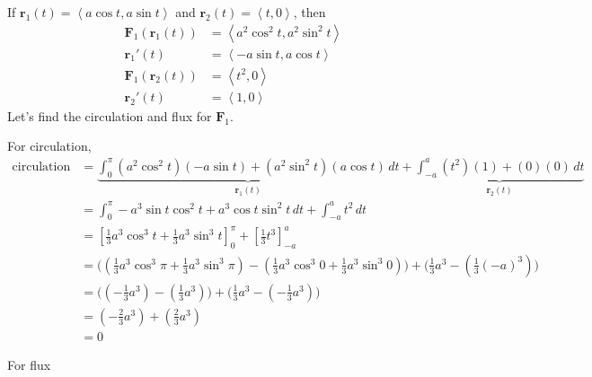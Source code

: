 \documentclass{article}
\newcommand{\lrp}[1]{\left( #1 \right)}
\newcommand{\lra}[1]{\left\langle #1 \right\rangle}
\newcommand{\lrb}[1]{\left[ #1 \right]}
\renewcommand{\r}[0]{\mathbf{r}}
\newcommand{\F}[0]{\mathbf{F}}
\begin{document}
If $\r_1(t)=\lra{a\cos t, a\sin t}$ and $\r_2 (t)=\lra{t,0}$, then
\begin{align*}
    \F_1\lrp{\r_1(t)}&=\lra{a^2\cos^2 t, a^2\sin ^2 t}\\
    \r_1'(t)&=\lra{-a \sin t ,a \cos t}\\
    \F_1\lrp{\r_2(t)}&=\lra{t^2,0}\\
    \r_2'(t)&=\lra{1,0}
\end{align*}
Let's find the circulation and flux for $\F_1$.
{}
For circulation,
\begin{align*}
    \text{circulation}&=\underbrace{\int_0^\pi \lrp{a^2\cos ^2 t}\lrp{-a\sin t}+\lrp{a^2\sin ^2 t}\lrp{a \cos t}\,dt}_{\r_1(t)} + \underbrace{\int_{-a}^a \lrp{t^2}\lrp{1}+\lrp{0}\lrp{0}\,dt}_{\r_2(t)}\\
    &=\int_0^\pi -a^3 \sin t \cos ^2 t + a^3 \cos t \sin^2 t\,dt + \int_{-a}^a t^2\,dt\\
    &=\lrb{\frac{1}{3}a^3\cos^3 t + \frac{1}{3}a^3 \sin^3 t}_0^\pi + \lrb{\frac{1}{3}t^3}_{-a}^a\tag{or break up left integral and do u-sub(s)}\\
    &=\Bigg(\lrp{\frac{1}{3}a^3 \cos ^3 \pi + \frac{1}{3}a^3 \sin ^3 \pi}-\lrp{\frac{1}{3}a^3 \cos ^3 0 + \frac{1}{3}a^3 \sin ^3 0}\Bigg)+\Bigg(\frac{1}{3}a^3 - \lrp{\frac{1}{3}(-a)^3}\Bigg)\\
    &=\Bigg(\lrp{-\frac{1}{3}a^3}-\lrp{\frac{1}{3}a^3}\Bigg)+\Bigg(\frac{1}{3}a^3-\lrp{-\frac{1}{3}a^3}\Bigg)\\
    &=\lrp{-\frac{2}{3}a^3}+\lrp{\frac{2}{3}a^3}\\
    &=0
\end{align*}
{}
For flux
\end{document}
